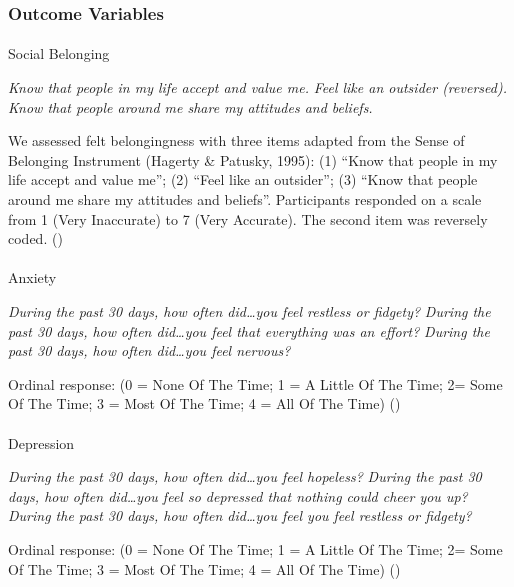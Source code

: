 \documentclass[
  single column]{article}
\makeatletter
\let\oldparagraph\paragraph
\renewcommand{\paragraph}{
    \@ifstar
      \xxxParagraphStar
      \xxxParagraphNoStar
  }
\newcommand{\xxxParagraphStar}[1]{\oldparagraph*{#1}\mbox{}}
\newcommand{\xxxParagraphNoStar}[1]{\oldparagraph{#1}\mbox{}}
\makeatother
\begin{document}
\subsubsection{Outcome Variables}\label{outcome-variables}

\paragraph{Social Belonging}\label{social-belonging-1}

\emph{Know that people in my life accept and value me.} \emph{Feel like
an outsider (reversed).} \emph{Know that people around me share my
attitudes and beliefs.}

We assessed felt belongingness with three items adapted from the Sense
of Belonging Instrument (Hagerty \& Patusky, 1995): (1) ``Know that
people in my life accept and value me''; (2) ``Feel like an outsider'';
(3) ``Know that people around me share my attitudes and beliefs''.
Participants responded on a scale from 1 (Very Inaccurate) to 7 (Very
Accurate). The second item was reversely coded.
()

\paragraph{Anxiety}\label{anxiety}

\emph{During the past 30 days, how often did\ldots you feel restless or
fidgety?} \emph{During the past 30 days, how often did\ldots you feel
that everything was an effort?} \emph{During the past 30 days, how often
did\ldots you feel nervous?}

Ordinal response: (0 = None Of The Time; 1 = A Little Of The Time; 2=
Some Of The Time; 3 = Most Of The Time; 4 = All Of The Time)
()

\paragraph{Depression}\label{depression}

\emph{During the past 30 days, how often did\ldots you feel hopeless?}
\emph{During the past 30 days, how often did\ldots you feel so depressed
that nothing could cheer you up?} \emph{During the past 30 days, how
often did\ldots you feel you feel restless or fidgety?}

Ordinal response: (0 = None Of The Time; 1 = A Little Of The Time; 2=
Some Of The Time; 3 = Most Of The Time; 4 = All Of The Time)
()
\end{document}
